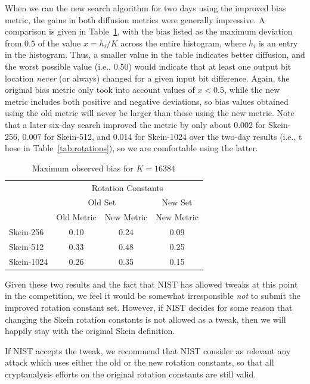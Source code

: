 \documentclass[11pt,twoside]{article}
\begin{document}
When we ran the new search algorithm for two days using the improved bias metric, the gains in both diffusion metrics were generally impressive. A comparison is given in Table~\ref{tab:rotbiascomparison}, with the bias listed as the maximum deviation from $0.5$ of the value $x = h_i/K$ across the entire histogram, where $h_i$ is an entry in the histogram.  Thus, a smaller value in the table indicates better diffusion, and the worst possible value (i.e., 0.50) would indicate that at least one output bit location \emph{never} (or always) changed for a given input bit difference. Again, the original bias metric only took into account values of $x < 0.5$, while the new metric includes both positive and negative deviations, so bias values obtained using the old metric will never be larger than those using the new metric. Note that a later six-day search improved the metric by only about 0.002 for Skein-256, 0.007 for Skein-512, and 0.014 for Skein-1024 over the two-day results (i.e., t
hose in Table~\ref{tab:rotations}), so we are comfortable using the latter.


\begin{table}[htb]
  \begin{center}
    \begin{tabular}{|l|c|c|c|}
    \hline
    & \multicolumn{3}{c|}{Rotation Constants}  \\ \cline{2-4}
    & \multicolumn{2}{c|}{Old Set} & New Set   \\ \cline{2-4}
    & Old Metric & New Metric & New Metric     \\
	\hline
    Skein-256  & 0.10  &  0.24  & 0.09  \\
    Skein-512  & 0.33  &  0.48  & 0.25  \\
    Skein-1024 & 0.26  &  0.35  & 0.15  \\
    \hline
    \end{tabular}
   \end{center}\caption{Maximum observed bias for $K=16384$}
  \label{tab:rotbiascomparison}
\end{table}

Given these two results and the fact that NIST has allowed tweaks at this point in the competition, we feel it would be somewhat irresponsible \emph{not} to submit the improved rotation constant set. However, if NIST decides for some reason that changing the Skein rotation constants is not allowed as a tweak, then we will happily stay with the original Skein definition.

If NIST accepts the tweak, we recommend that NIST consider as relevant any attack which uses either the old or the new rotation constants, so that all cryptanalysis efforts on the original rotation constants are still valid.
\end{document}
